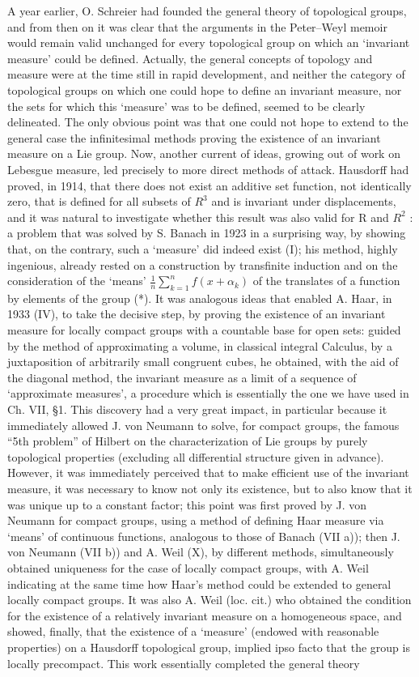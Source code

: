 A year earlier, O. Schreier had founded the general theory of topological groups, and from then on it was clear that the arguments in the Peter--Weyl memoir would remain valid unchanged for every topological group on which an `invariant measure' could be defined. Actually, the general concepts of topology and measure were at the time still in rapid development, and neither the category of topological groups on which one could hope to define an invariant measure, nor the sets for which this `measure' was to be defined, seemed to be clearly delineated. The only obvious point was that one could not hope to extend to the general case the infinitesimal methods proving the existence of an invariant measure on a Lie group. Now, another current of ideas, growing out of work on Lebesgue measure, led precisely to more direct methods of attack. Hausdorff had proved, in 1914, that there does not exist an additive set function, not identically zero, that is defined for all subsets of \(R^{3}\) and is invariant under displacements, and it was natural to investigate whether this result was also valid for R and \(R^{2}\) : a problem that was solved by S. Banach in 1923 in a surprising way, by showing that, on the contrary, such a `measure' did indeed exist (I); his method, highly ingenious, already rested on a construction by transfinite induction and on the consideration of the `means' \(\frac{1}{n}\sum_{k=1}^{n}f(x+\alpha_{k})\) of the translates of a function by elements of the group (*). It was analogous ideas that enabled A. Haar, in 1933 (IV), to take the decisive step, by proving the existence of an invariant measure for locally compact groups with a countable base for open sets: guided by the method of approximating a volume, in classical integral Calculus, by a juxtaposition of arbitrarily small congruent cubes, he obtained, with the aid of the diagonal method, the invariant measure as a limit of a sequence of `approximate measures', a procedure which is essentially the one we have used in Ch. VII, §1. This discovery had a very great impact, in particular because it immediately allowed J. von Neumann to solve, for compact groups, the famous ``5th problem'' of Hilbert on the characterization of Lie groups by purely topological properties (excluding all differential structure given in advance). However, it was immediately perceived that to make efficient use of the invariant measure, it was necessary to know not only its existence, but to also know that it was unique up to a constant factor; this point was first proved by J. von Neumann for compact groups, using a method of defining Haar measure via `means' of continuous functions, analogous to those of Banach (VII a)); then J. von Neumann (VII b)) and A. Weil (X), by different methods, simultaneously obtained uniqueness for the case of locally compact groups, with A. Weil indicating at the same time how Haar's method could be extended to general locally compact groups. It was also A. Weil (loc. cit.) who obtained the condition for the existence of a relatively invariant measure on a homogeneous space, and showed, finally, that the existence of a `measure' (endowed with reasonable properties) on a Hausdorff topological group, implied ipso facto that the group is locally precompact. This work essentially completed the general theory 